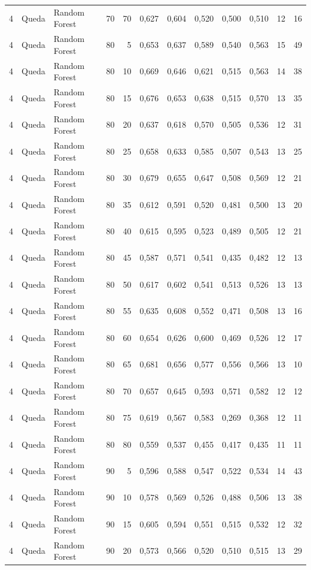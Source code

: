 \begin{longtable}{@{}rllrrrrrrrrr@{}}
4 & Queda & Random Forest & 70 & 70 & 0,627 & 0,604 & 0,520 & 0,500 & 0,510 & 12 & 16 \\
4 & Queda & Random Forest & 80 & 5 & 0,653 & 0,637 & 0,589 & 0,540 & 0,563 & 15 & 49 \\
4 & Queda & Random Forest & 80 & 10 & 0,669 & 0,646 & 0,621 & 0,515 & 0,563 & 14 & 38 \\
4 & Queda & Random Forest & 80 & 15 & 0,676 & 0,653 & 0,638 & 0,515 & 0,570 & 13 & 35 \\
4 & Queda & Random Forest & 80 & 20 & 0,637 & 0,618 & 0,570 & 0,505 & 0,536 & 12 & 31 \\
4 & Queda & Random Forest & 80 & 25 & 0,658 & 0,633 & 0,585 & 0,507 & 0,543 & 13 & 25 \\
4 & Queda & Random Forest & 80 & 30 & 0,679 & 0,655 & 0,647 & 0,508 & 0,569 & 12 & 21 \\
4 & Queda & Random Forest & 80 & 35 & 0,612 & 0,591 & 0,520 & 0,481 & 0,500 & 13 & 20 \\
4 & Queda & Random Forest & 80 & 40 & 0,615 & 0,595 & 0,523 & 0,489 & 0,505 & 12 & 21 \\
4 & Queda & Random Forest & 80 & 45 & 0,587 & 0,571 & 0,541 & 0,435 & 0,482 & 12 & 13 \\
4 & Queda & Random Forest & 80 & 50 & 0,617 & 0,602 & 0,541 & 0,513 & 0,526 & 13 & 13 \\
4 & Queda & Random Forest & 80 & 55 & 0,635 & 0,608 & 0,552 & 0,471 & 0,508 & 13 & 16 \\
4 & Queda & Random Forest & 80 & 60 & 0,654 & 0,626 & 0,600 & 0,469 & 0,526 & 12 & 17 \\
4 & Queda & Random Forest & 80 & 65 & 0,681 & 0,656 & 0,577 & 0,556 & 0,566 & 13 & 10 \\
4 & Queda & Random Forest & 80 & 70 & 0,657 & 0,645 & 0,593 & 0,571 & 0,582 & 12 & 12 \\
4 & Queda & Random Forest & 80 & 75 & 0,619 & 0,567 & 0,583 & 0,269 & 0,368 & 12 & 11 \\
4 & Queda & Random Forest & 80 & 80 & 0,559 & 0,537 & 0,455 & 0,417 & 0,435 & 11 & 11 \\
4 & Queda & Random Forest & 90 & 5 & 0,596 & 0,588 & 0,547 & 0,522 & 0,534 & 14 & 43 \\
4 & Queda & Random Forest & 90 & 10 & 0,578 & 0,569 & 0,526 & 0,488 & 0,506 & 13 & 38 \\
4 & Queda & Random Forest & 90 & 15 & 0,605 & 0,594 & 0,551 & 0,515 & 0,532 & 12 & 32 \\
4 & Queda & Random Forest & 90 & 20 & 0,573 & 0,566 & 0,520 & 0,510 & 0,515 & 13 & 29 \\

\end{longtable}
